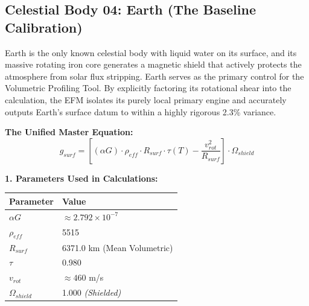 \documentclass[11pt, a4paper]{article}
\begin{document}
\clearpage
\subsection{Celestial Body 04: Earth (The Baseline Calibration)}
  Earth is the only known celestial body with liquid water on its surface, and its massive rotating iron core generates a magnetic shield that actively protects the atmosphere from solar flux stripping. Earth serves as the primary control for the Volumetric Profiling Tool. By explicitly factoring its rotational shear into the calculation, the EFM isolates its purely local primary engine and accurately outputs Earth's surface datum to within a highly rigorous 2.3\% variance.

  \vspace{0.5em}
  \noindent \textbf{The Unified Master Equation:}
  $$ g_{surf} = \left[ (\alpha G) \cdot \rho_{eff} \cdot R_{surf} \cdot \tau(T) - \frac{v_{rot}^2}{R_{surf}} \right] \cdot \Omega_{shield} $$

  \vspace{0.5em}
  \noindent \textbf{1. Parameters Used in Calculations:} \\[0.5em]
  \begingroup
  \renewcommand{\arraystretch}{1.3}
  \hspace*{2em}
  \begin{tabular}{|l|l|}
    \hline
    \textbf{Parameter} & \textbf{Value} \\ \hline
    $\alpha G$ & $\approx 2.792 \times 10^{-7}$ \\ \hline
    $\rho_{eff}$ & 5515 \\ \hline
    $R_{surf}$ & 6371.0 km (Mean Volumetric) \\ \hline
    $\tau$ & 0.980 \\ \hline
    $v_{rot}$ & $\approx 460$ m/s \\ \hline
    $\Omega_{shield}$ & 1.000 \textit{(Shielded)} \\ \hline
  \end{tabular}
  \endgroup
\end{document}
